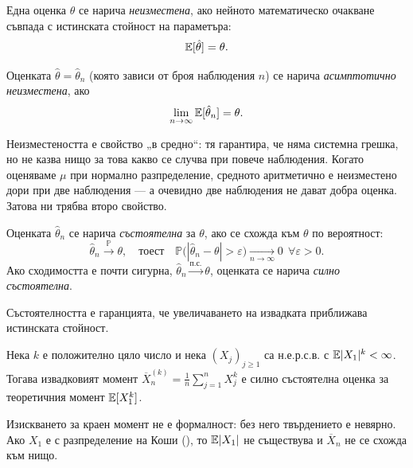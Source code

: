 \begin{defn}\label{def:unbiased}
Една оценка $\hat{\theta}$ се нарича \emph{неизместена}, ако нейното математическо очакване съвпада с истинската стойност на параметъра:
\[ \mathbb{E}[\hat{\theta}] = \theta . \]
\end{defn}

\begin{defn}\label{def:asymp-unbiased}
Оценката $\hat{\theta} = \hat{\theta}_n$ (която зависи от броя наблюдения $n$) се нарича
\emph{асимптотично неизместена}, ако
\[ \lim_{n \to \infty} \mathbb{E}[\hat{\theta}_n] = \theta . \]
\end{defn}

Неизместеността е свойство „в средно“: тя гарантира, че няма системна грешка, но не казва
нищо за това какво се случва при повече наблюдения. Когато оценяваме $\mu$ при нормално
разпределение, средното аритметично е неизместено дори при две наблюдения — а очевидно две
наблюдения не дават добра оценка. Затова ни трябва второ свойство.

\begin{keydefn}[състоятелност]\label{def:consistency}
Оценката $\hat{\theta}_n$ се нарича \emph{състоятелна} за $\theta$, ако се схожда към
$\theta$ по вероятност:
\[ \hat{\theta}_n \xrightarrow{\mathbb{P}} \theta,
   \quad\text{тоест}\quad
   \mathbb{P}\big(|\hat{\theta}_n - \theta| > \varepsilon\big) \xrightarrow[n \to \infty]{} 0
   \ \ \forall \varepsilon > 0 . \]
Ако сходимостта е почти сигурна, $\hat{\theta}_n \xrightarrow{\text{п.с.}} \theta$, оценката се
нарича \emph{силно състоятелна}.
\end{keydefn}

Състоятелността е гаранцията, че увеличаването на извадката приближава истинската стойност.

\begin{supp}\label{prop:moment-consistency}
Нека $k$ е положително цяло число и нека $(X_j)_{j\ge1}$ са н.е.р.с.в. с
$\mathbb{E}|X_1|^k < \infty$. Тогава извадковият момент
$\overline{X}_n^{(k)} = \frac1n \sum_{j=1}^n X_j^k$ е силно състоятелна оценка за
теоретичния момент $\mathbb{E}[X_1^k]$.
\end{supp}

\noindent
Изискването за краен момент не е формалност: без него твърдението е невярно. Ако $X_1$ е
с разпределение на Коши (), то
$\mathbb{E}|X_1|$ не съществува и $\overline{X}_n$ не се схожда към нищо.

